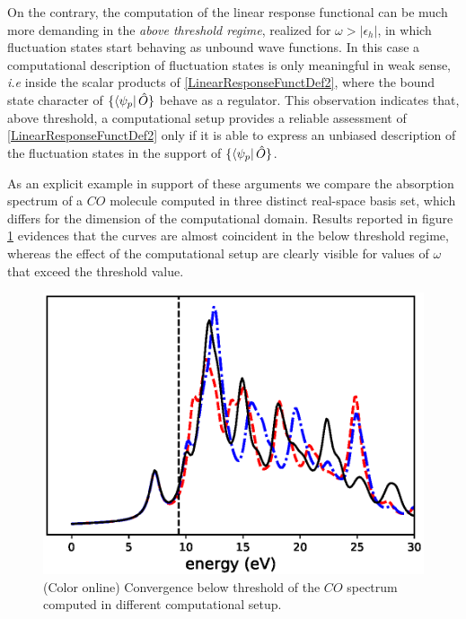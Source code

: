 \documentclass[reprint,aps,prb]{revtex4-1}
\newcommand{\eps}{\epsilon}
\newcommand{\op}[1]{\hat {#1}}
\begin{document}
On the contrary, the computation of the linear response functional can be much more demanding in the \emph{above threshold regime}, realized for $\omega>|\eps_h|$, in which fluctuation 
states start behaving as unbound wave functions. In this case a computational description of fluctuation states is only meaningful in weak sense, \emph{i.e} inside the scalar products of 
\eqref{LinearResponseFunctDef2}, where the bound state character of $\{\bra{\psi_p}\op O\}$ behave as a regulator. This observation indicates that, above threshold, a computational setup 
provides a reliable assessment of \eqref{LinearResponseFunctDef2} only if it is able to express an unbiased description of the fluctuation states in the support of $\{\bra{\psi_p}\op O\}$. 

As an explicit example in support of these arguments we compare the absorption spectrum of a $CO$ molecule computed in three distinct real-space basis set, which differs for the dimension of 
the computational domain. Results reported in figure \ref{co_spectrum} evidences that the curves are almost coincident in the below threshold regime, whereas the effect of the computational 
setup are clearly visible for values of $\omega$ that exceed the threshold value. 


\begin{figure}
\includegraphics[scale=0.56]{co_spectrum.eps}
\caption{\label{co_spectrum}(Color online) Convergence below threshold of the $CO$ spectrum computed in different computational setup.}
\end{figure}
\end{document}
